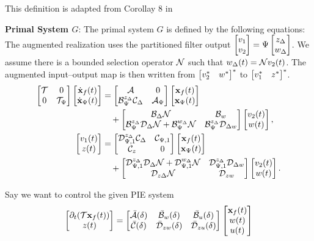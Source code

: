 This definition is adapted from Corollay 8 in \cite{10156335}
\begin{definition}\label{def:partitioned_augmented_systems}
	\noindent \textbf{Primal System \( G \)}:
	The primal system \( G \) is defined by the following equations:
	The augmented realization uses the partitioned filter
	output \(\begin{bmatrix}v_1\\v_2\end{bmatrix}=\Psi\begin{bmatrix}z_\Delta\\w_\Delta\end{bmatrix}\). We assume
	there is a bounded selection operator \(\mathcal{N}\) such that
	\(w_\Delta(t)=\mathcal{N} v_2(t)\). The augmented input--output map is then
	written from \(\begin{bmatrix}v_2^*&w^*\end{bmatrix}^*\) to \(\begin{bmatrix}v_1^*&z^*\end{bmatrix}^*\).
	\begin{equation}
		\begin{aligned}
			\begin{bmatrix}\mathcal{T} & 0 \\ 0 & \mathcal{T}_{\Psi}\end{bmatrix}
			\begin{bmatrix}{\dot{\mathbf{x}}}_f(t) \\ \dot{\mathbf{x}}_\Psi(t)\end{bmatrix}
				&=
			\begin{bmatrix}
				\mathcal{A} & 0 \\
				\mathcal{B}_{\Psi}^{z_\Delta}\mathcal{C}_{\Delta} & \mathcal{A}_\Psi
			\end{bmatrix}
			\begin{bmatrix}{\mathbf{x}}_f(t) \\ \mathbf{x}_\Psi(t)\end{bmatrix} \\
				&\quad+
			\begin{bmatrix}
				\mathcal{B}_{\Delta}\mathcal{N} & \mathcal{B}_w \\
				\mathcal{B}^{z_\Delta}_\Psi\mathcal{D}_\Delta\mathcal{N} + \mathcal{B}_\Psi^{w_\Delta}\mathcal{N} &
				\mathcal{B}_{\Psi}^{z_\Delta}\mathcal{D}_{\Delta w}
			\end{bmatrix}
			\begin{bmatrix}v_2(t) \\ w(t)\end{bmatrix}, \\
			{\begin{bmatrix}v_1(t)\\z(t)\end{bmatrix}}
				&=
			{\begin{bmatrix}
				\mathcal{D}^{z_\Delta}_{\Psi,1}\mathcal{C}_\Delta & \mathcal{C}_{\Psi,1} \\
				\mathcal{C}_z & 0
			\end{bmatrix}}
			\begin{bmatrix}{\mathbf{x}}_f(t) \\ \mathbf{x}_\Psi(t)\end{bmatrix} \\
				&\quad+
			{\begin{bmatrix}
				\mathcal{D}^{z_\Delta}_{\Psi,1}\mathcal{D}_\Delta\mathcal{N} + \mathcal{D}^{w_\Delta}_{\Psi,1}\mathcal{N} &
				\mathcal{D}^{z_\Delta}_{\Psi,1}\mathcal{D}_{\Delta w} \\
				\mathcal{D}_{z\Delta}\mathcal{N} & \mathcal{D}_{zw}
			\end{bmatrix}}
			\begin{bmatrix}v_2(t) \\ w(t)\end{bmatrix}.
		\end{aligned}
	\end{equation}
\end{definition}
Say we want to control the given PIE system
\begin{equation*}
	\begin{bmatrix}\partial_t(\mathcal{T}\mathbf{x}_f(t)) \\ z(t)\end{bmatrix}
	=
	\begin{bmatrix}
		\bar{\mathcal{A}}(\delta) & \bar{\mathcal{B}}_w(\delta) & \bar{\mathcal{B}}_u(\delta) \\
		\bar{\mathcal{C}}(\delta) & \bar{\mathcal{D}}_{zw}(\delta) & \bar{\mathcal{D}}_{zu}(\delta)
	\end{bmatrix}
	\begin{bmatrix}\mathbf{x}_f(t) \\ w(t) \\ u(t)\end{bmatrix}
\end{equation*}
